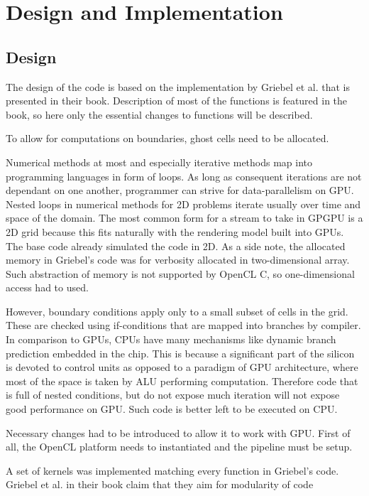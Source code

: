 \chapter{Design and Implementation}

\section{Design}
The design of the code is based on the implementation by Griebel et al. that is presented in their book\cite{griebel1998numerical}. Description of most of the functions is featured in the book, so here only the essential changes to functions will be described.

To allow for computations on boundaries, ghost cells need to be allocated.

Numerical methods at most and especially iterative methods map into programming languages in form of loops. As long as consequent iterations are not dependant on one another, programmer can strive for data-parallelism on GPU. Nested loops in numerical methods for 2D problems iterate usually over time and space of the domain. The most common form for a stream to take in GPGPU is a 2D grid because this fits naturally with the rendering model built into GPUs. The base code already simulated the code in 2D. As a side note, the allocated memory in Griebel's code was for verbosity allocated in two-dimensional array. Such abstraction of memory is not supported by OpenCL C, so one-dimensional access had to used.

However, boundary conditions apply only to a small subset of cells in the grid. These are checked using if-conditions that are mapped into branches by compiler. In comparison to GPUs, CPUs have many mechanisms like dynamic branch prediction embedded in the chip. This is because a significant part of the silicon is devoted to control units as opposed to a paradigm of GPU architecture, where most of the space is taken by ALU performing computation. Therefore code that is full of nested conditions, but do not expose much iteration will not expose good performance on GPU. Such code is better left to be executed on CPU.

Necessary changes had to be introduced to allow it to work with GPU. First of all, the OpenCL platform needs to instantiated and the pipeline must be setup.  


A set of kernels was implemented matching every function in Griebel's code. Griebel et al. in their book claim that they aim for modularity of code

